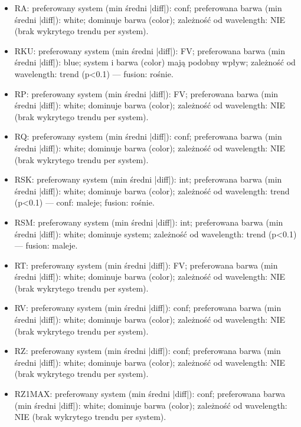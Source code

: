 \documentclass[
  10pt,
]{article}
\begin{document}
\begin{itemize}
\item RA: preferowany system (min średni |diff|): conf; preferowana barwa (min średni |diff|): white; dominuje barwa (color); zależność od wavelength: NIE (brak wykrytego trendu per system).
\item RKU: preferowany system (min średni |diff|): FV; preferowana barwa (min średni |diff|): blue; system i barwa (color) mają podobny wpływ; zależność od wavelength: trend (p<0.1) — fusion: rośnie.
\item RP: preferowany system (min średni |diff|): FV; preferowana barwa (min średni |diff|): white; dominuje barwa (color); zależność od wavelength: NIE (brak wykrytego trendu per system).
\item RQ: preferowany system (min średni |diff|): conf; preferowana barwa (min średni |diff|): white; dominuje barwa (color); zależność od wavelength: NIE (brak wykrytego trendu per system).
\item RSK: preferowany system (min średni |diff|): int; preferowana barwa (min średni |diff|): white; dominuje barwa (color); zależność od wavelength: trend (p<0.1) — conf: maleje; fusion: rośnie.
\item RSM: preferowany system (min średni |diff|): int; preferowana barwa (min średni |diff|): white; dominuje system; zależność od wavelength: trend (p<0.1) — fusion: maleje.
\item RT: preferowany system (min średni |diff|): FV; preferowana barwa (min średni |diff|): white; dominuje barwa (color); zależność od wavelength: NIE (brak wykrytego trendu per system).
\item RV: preferowany system (min średni |diff|): conf; preferowana barwa (min średni |diff|): white; dominuje barwa (color); zależność od wavelength: NIE (brak wykrytego trendu per system).
\item RZ: preferowany system (min średni |diff|): conf; preferowana barwa (min średni |diff|): white; dominuje barwa (color); zależność od wavelength: NIE (brak wykrytego trendu per system).
\item RZ1MAX: preferowany system (min średni |diff|): conf; preferowana barwa (min średni |diff|): white; dominuje barwa (color); zależność od wavelength: NIE (brak wykrytego trendu per system).
\end{itemize}
\end{document}
